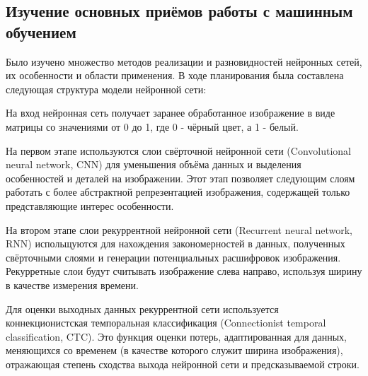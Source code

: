 \documentclass[../document.tex]{subfiles}
\begin{document}
\subsection{Изучение основных приёмов работы с машинным обучением}
\par Было изучено множество методов реализации и разновидностей нейронных сетей, их особенности и области применения. В ходе планирования была составлена следующая структура модели нейронной сети:
\par На вход нейронная сеть получает заранее обработанное изображение в виде матрицы со значениями от 0 до 1, где 0 - чёрный цвет, а 1 - белый.
\par На первом этапе используются слои свёрточной нейронной сети (Convolutional neural network, CNN) для уменьшения объёма данных и выделения особенностей и деталей на изображении. Этот этап позволяет следующим слоям работать с более абстрактной репрезентацией изображения, содержащей только представляющие интерес особенности.
\par На втором этапе слои рекуррентной нейронной сети (Recurrent neural network, RNN) испольщуются для нахождения закономерностей в данных, полученных свёрточными слоями и генерации потенциальных расшифровок изображения. Рекурретные слои будут считывать изображение слева направо, используя ширину в качестве измерения времени.
\par Для оценки выходных данных рекуррентной сети используется коннекционистская темпоральная классификация (Connectionist temporal classification, CTC). Это функция оценки потерь, адаптированная для данных, меняющихся со временем (в качестве которого служит ширина изображения), отражающая степень сходства выхода нейронной сети и предсказываемой строки.
\end{document}
